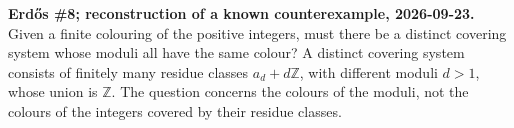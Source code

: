\textbf{Erd\H{o}s \#8; reconstruction of a known counterexample, 2026-09-23.}
Given a finite colouring of the positive integers, must there be a distinct covering system whose moduli all have the same colour? A distinct covering system consists of finitely many residue classes $a_d+d\mathbb Z$, with different moduli $d>1$, whose union is $\mathbb Z$. The question concerns the colours of the moduli, not the colours of the integers covered by their residue classes.
